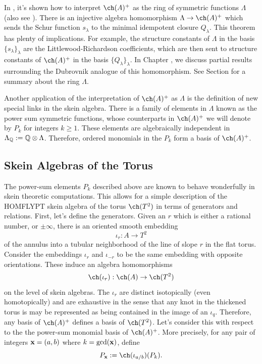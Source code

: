 In , it's shown how to interpret $\ch(A)^+$ as the ring of symmetric functions $\Lambda$ (also see ). There is an injective algebra homomorphism $\Lambda \to \ch(A)^+$ which sends the Schur function $s_\lambda$ to the minimal idempotent closure $Q_\lambda$. This theorem has plenty of implications. For example, the structure constants of $\Lambda$ in the basis $\{ s_\lambda \}_\lambda$ are the Littlewood-Richardson coefficients, which are then sent to structure constants of $\ch(A)^+$ in the basis $\{ Q_\lambda \}_\lambda$. In Chapter , we discuss partial results surrounding the Dubrovnik analogue of this homomorphism. See Section  for a summary about the ring $\Lambda$.

Another application of the interpretation of $\ch(A)^+$ as $\Lambda$ is the definition of new special links in the skein algebra. There is a family of elements in $\Lambda$ known as the power sum symmetric functions, whose counterparts in $\ch(A)^+$ we will denote by $P_k$ for integers $k \geq 1$. These elements are algebraically independent in $\Lambda_{\mathbb{Q}} := \mathbb{Q} \otimes \Lambda$. Therefore, ordered monomials in the $P_k$ form a basis of $\ch(A)^+$.


\subsection{Skein Algebras of the Torus}

The power-sum elements $P_k$ described above are known to behave wonderfully in skein theoretic computations. This allows for a simple description of the HOMFLYPT skein algebra of the torus $\ch(T^2)$ in terms of generators and relations. First, let's define the generators. Given an $r$ which is either a rational number, or $\pm \infty$, there is an oriented smooth embedding 
\[
\iota_{r}: A \to T^2
\]
of the annulus into a tubular neighborhood of the line of slope $r$ in the flat torus. Consider the embeddings $\iota_{r}$ and $\iota_{-r}$ to be the same embedding with opposite orientations. These induce an algebra homomorphisms
\[
\ch(\iota_r): \ch(A) \to \ch(T^2)
\]
on the level of skein algebras. The $\iota_r$ are distinct isotopically (even homotopically) and are exhaustive in the sense that any knot in the thickened torus is may be represented as being contained in the image of an $\iota_q$. Therefore, any basis of $\ch(A)^+$ defines a basis of $\ch(T^2)$. Let's consider this with respect to the the power-sum monomial basis of $\ch(A)^+$. More precisely, for any pair of integers ${\mathbf{x}} = (a, b)$ where $k = \gcd({\mathbf{x}})$, define 
\[
P_\xx := \ch(\iota_{a/b})(P_k).
\]

